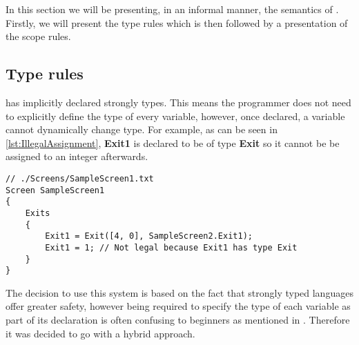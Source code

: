 In this section we will be presenting, in an informal manner, the semantics of \dazel. 
Firstly, we will present the type rules which is then followed by a presentation of the scope rules.



\subsection*{Type rules}
\dazel has implicitly declared strongly types.
This means the programmer does not need to explicitly define the type of every variable, however, once declared, a variable
cannot dynamically change type.
For example, as can be seen in \ref{lst:IllegalAssignment}, \textbf{Exit1} is declared to be of type \textbf{Exit} so it cannot be be
assigned to an integer afterwards.

\begin{lstlisting}[caption={Example of an illegal assingment}, label={lst:IllegalAssignment},escapechar=|]
// ./Screens/SampleScreen1.txt
Screen SampleScreen1 
{
	Exits 
	{
		Exit1 = Exit([4, 0], SampleScreen2.Exit1);
		Exit1 = 1; // Not legal because Exit1 has type Exit
	}
}
\end{lstlisting}

The decision to use this system is based on the fact that strongly typed languages offer greater safety, however being required to
specify the type of each variable as part of its declaration is often confusing to beginners as mentioned in .
Therefore it was decided to go with a hybrid approach.